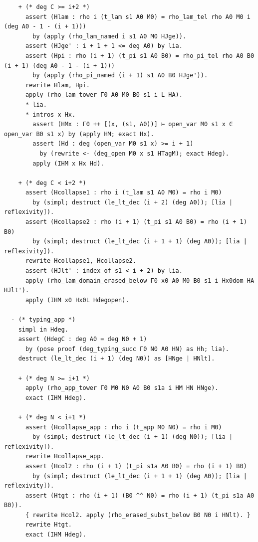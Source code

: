 \begin{latin}
\begin{verbatim}
    + (* deg C >= i+2 *)
      assert (Hlam : rho i (t_lam s1 A0 M0) = rho_lam_tel rho A0 M0 i (deg A0 - 1 - (i + 1)))
        by (apply (rho_lam_named i s1 A0 M0 HJge)).
      assert (HJge' : i + 1 + 1 <= deg A0) by lia.
      assert (Hpi : rho (i + 1) (t_pi s1 A0 B0) = rho_pi_tel rho A0 B0 (i + 1) (deg A0 - 1 - (i + 1)))
        by (apply (rho_pi_named (i + 1) s1 A0 B0 HJge')).
      rewrite Hlam, Hpi.
      apply (rho_lam_tower Γ0 A0 M0 B0 s1 i L HA).
      * lia.
      * intros x Hx.
        assert (HMx : Γ0 ++ [(x, (s1, A0))] ⊢ open_var M0 s1 x ∈ open_var B0 s1 x) by (apply HM; exact Hx).
        assert (Hd : deg (open_var M0 s1 x) >= i + 1)
          by (rewrite <- (deg_open M0 x s1 HTagM); exact Hdeg).
        apply (IHM x Hx Hd).

    + (* deg C < i+2 *)
      assert (Hcollapse1 : rho i (t_lam s1 A0 M0) = rho i M0)
        by (simpl; destruct (le_lt_dec (i + 2) (deg A0)); [lia | reflexivity]).
      assert (Hcollapse2 : rho (i + 1) (t_pi s1 A0 B0) = rho (i + 1) B0)
        by (simpl; destruct (le_lt_dec (i + 1 + 1) (deg A0)); [lia | reflexivity]).
      rewrite Hcollapse1, Hcollapse2.
      assert (HJlt' : index_of s1 < i + 2) by lia.
      apply (rho_lam_domain_erased_below Γ0 x0 A0 M0 B0 s1 i Hx0dom HA HJlt').
      apply (IHM x0 Hx0L Hdegopen).

  - (* typing_app *)
    simpl in Hdeg.
    assert (HdegC : deg A0 = deg N0 + 1)
      by (pose proof (deg_typing_succ Γ0 N0 A0 HN) as Hh; lia).
    destruct (le_lt_dec (i + 1) (deg N0)) as [HNge | HNlt].

    + (* deg N >= i+1 *)
      apply (rho_app_tower Γ0 M0 N0 A0 B0 s1a i HM HN HNge).
      exact (IHM Hdeg).

    + (* deg N < i+1 *)
      assert (Hcollapse_app : rho i (t_app M0 N0) = rho i M0)
        by (simpl; destruct (le_lt_dec (i + 1) (deg N0)); [lia | reflexivity]).
      rewrite Hcollapse_app.
      assert (Hcol2 : rho (i + 1) (t_pi s1a A0 B0) = rho (i + 1) B0)
        by (simpl; destruct (le_lt_dec (i + 1 + 1) (deg A0)); [lia | reflexivity]).
      assert (Htgt : rho (i + 1) (B0 ^^ N0) = rho (i + 1) (t_pi s1a A0 B0)).
      { rewrite Hcol2. apply (rho_erased_subst_below B0 N0 i HNlt). }
      rewrite Htgt.
      exact (IHM Hdeg).


\end{verbatim}
\end{latin}
